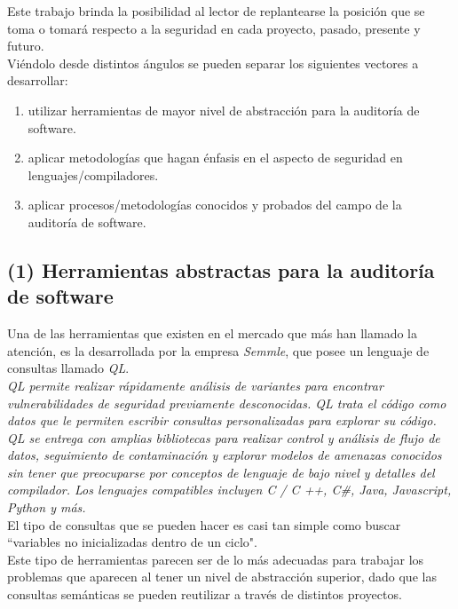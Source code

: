 Este trabajo brinda la posibilidad al lector de replantearse la posición que se toma o tomará respecto a la seguridad en cada proyecto, pasado, presente y futuro.\\

Viéndolo desde distintos ángulos se pueden separar los siguientes vectores a desarrollar:
\begin{enumerate}
    \item utilizar herramientas de mayor nivel de abstracción para la auditoría de software.
    \item aplicar metodologías que hagan énfasis en el aspecto de seguridad en lenguajes/compiladores.  
    \item aplicar procesos/metodologías conocidos y probados del campo de la auditoría de software.
\end{enumerate}

\subsection{(1) Herramientas abstractas para la auditoría de software}

Una de las herramientas que existen en el mercado que más han llamado la atención, es la desarrollada por la empresa \textit{Semmle}, que posee un lenguaje de consultas llamado \textit{QL}.\\


\textit{QL permite realizar rápidamente análisis de variantes para encontrar vulnerabilidades de seguridad previamente desconocidas. QL trata el código como datos que le permiten escribir consultas personalizadas para explorar su código.}\\

\textit{QL se entrega con amplias bibliotecas para realizar control y análisis de flujo de datos, seguimiento de contaminación y explorar modelos de amenazas conocidos sin tener que preocuparse por conceptos de lenguaje de bajo nivel y detalles del compilador. Los lenguajes compatibles incluyen C / C ++, C\#, Java, Javascript, Python y más.}\\

El tipo de consultas que se pueden hacer es casi tan simple como buscar ``variables no inicializadas dentro de un ciclo".\\

Este tipo de herramientas parecen ser de lo más adecuadas para trabajar los problemas que aparecen al tener un nivel de abstracción superior, dado que las consultas semánticas se pueden reutilizar a través de distintos proyectos.


